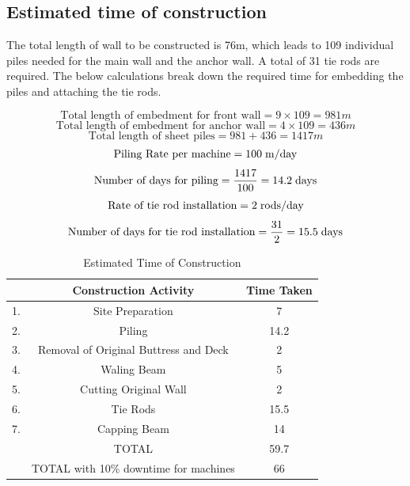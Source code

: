 \documentclass[12pt, a4paper]{article}
\begin{document}
\subsection{Estimated time of construction}
\begin{justify}
The total length of wall to be constructed is 76m, which leads to 109 individual piles needed for the main wall and the anchor wall. A total of 31 tie rods are required. The below calculations break down the required time for embedding the piles and attaching the tie rods.
\end{justify}
\begin{equation}
    \text{Total length of embedment for front wall}=9\times109=981m
\end{equation}
\begin{equation}
    \text{Total length of embedment for anchor wall}=4\times109=436m
\end{equation}
\begin{equation}
    \text{Total length of sheet piles}=981+436=1417m
\end{equation}
\begin{align*}
    \text{Piling Rate per machine}=100\hspace*{0.1cm}\text{m/day}
\end{align*}
\begin{equation}
    \text{Number of days for piling}=\frac{1417}{100}=14.2 \hspace*{0.1cm} \text{days}
\end{equation}
\begin{align*}
    \text{Rate of tie rod installation}=2\hspace*{0.1cm}\text{rods/day}
\end{align*}
\begin{equation}
    \text{Number of days for tie rod installation}=\frac{31}{2}=15.5\hspace*{0.1cm}\text{days}
\end{equation}
\begin{table}[H]
    \centering
    \begin{tabular}{|c|c|c|}
    \hline
      &\textbf{Construction Activity}&\textbf{Time Taken} \\ \hline
     1. &Site Preparation&7\\ \hline
      2.&Piling&14.2 \\ \hline
      3.&Removal of Original Buttress and Deck&2\\ \hline
       4.&Waling Beam&5\\ \hline
      5.&Cutting Original Wall &2 \\ \hline
      
      6.&Tie Rods&15.5 \\ \hline
      7.&Capping Beam &14 \\ \hline
     & TOTAL&59.7\\ \hline
     &TOTAL with 10\% downtime for machines&66 \\ \hline
    \end{tabular}
    \caption{Estimated Time of Construction}
    \label{time}
\end{table}
\end{document}
